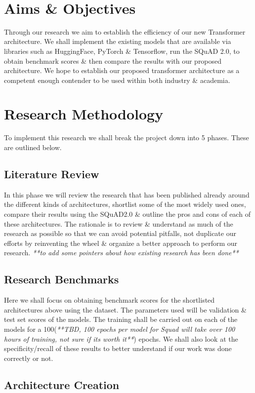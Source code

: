 \documentclass[11pt]{article}
\begin{document}
\
\newpage
\section{Aims \& Objectives}

Through our research we aim to establish the efficiency of our new Transformer architecture. We shall implement the existing models that are available via libraries such as HuggingFace\cite{hfTransformers}, PyTorch \& Tensorflow, run the SQuAD 2.0\cite{dataset}, to obtain benchmark scores \& then compare the results with our proposed architecture. We hope to establish our proposed transformer architecture as a competent enough contender to be used within both industry \& academia.
\section{Research Methodology}

To implement this research we shall break the project down into 5 phases. These are outlined below.
\subsection{Literature Review}
In this phase we will review the research that has been published already around the different kinds of architectures, shortlist some of the most widely used ones, compare their results using the SQuAD2.0 \cite{dataset} \& outline the pros and cons of each of these architectures. The rationale is to review \& understand as much of the research as possible so that we can avoid potential pitfalls, not duplicate our efforts by reinventing the wheel \& organize a better approach to perform our research.\textit{ **to add some pointers about how existing research has been done**}
\subsection{Research Benchmarks}
Here we shall focus on obtaining benchmark scores for the shortlisted architectures above using the dataset\cite{dataset}. The parameters used will be validation \& test set scores of the models. The training shall be carried out on each of the models for a 100(\textit{**TBD, 100 epochs per model for Squad will take over 100 hours of training, not sure if its worth it**}) epochs. We shall also look at the specificity/recall of these results to better understand if our work was done correctly or not.
\subsection{Architecture Creation}
\end{document}
